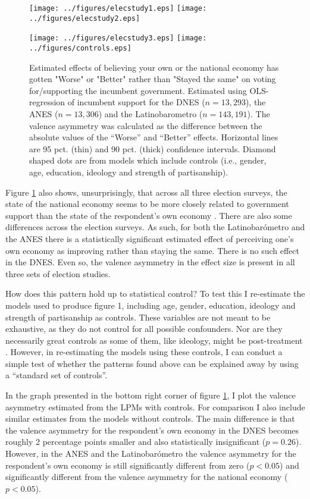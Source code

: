 \documentclass[a4paper,11pt]{article}
\begin{document}
	
	\begin{figure}[htbp]
		\texttt{[image: ../figures/elecstudy1.eps]} 	\centering	\texttt{[image: ../figures/elecstudy2.eps]} 
		
		\texttt{[image: ../figures/elecstudy3.eps]}
		\texttt{[image: ../figures/controls.eps]}
		\centering
		
		
		\caption{Estimated effects of believing your own or the national economy has gotten "Worse" or "Better" rather than "Stayed the same" on voting for/supporting the incumbent government. Estimated using OLS-regression of incumbent support for the DNES ($n=13,293$), the ANES ($n= 13,306$) and the Latinobarometro ($n= 143,191$). The valence asymmetry was calculated as the difference between the absolute values of the ``Worse'' and ``Better'' effects. Horizontal lines are 95 pct. (thin) and 90 pct. (thick) confidence intervals. Diamond shaped dots are from models which include controls (i.e., gender, age, education, ideology and strength of partisanship).}
		\label{electionstudy}
	\end{figure}
	
	Figure \ref{electionstudy}  also shows, unsurprisingly, that across all three election surveys, the state of the national economy seems to be more closely related to government support than the state of the respondent's own economy \cite[cf.][]{kinder1981sociotropic}. There are also some differences across the election surveys.  As such, for both the Latinobarómetro and the ANES there is a statistically significant estimated effect of perceiving one's own economy as improving rather than staying the same. There is no such effect in the DNES. Even so, the valence asymmetry in the effect size is present in all three sets of election studies.
	
	How does this pattern hold up to statistical control? To test this I re-estimate the models used to produce figure 1, including age, gender, education, ideology and strength of partisanship as controls. These variables are not meant to be exhaustive, as they do not control for all possible confounders. Nor are they necessarily great controls as some of them, like ideology, might be post-treatment \citep{king2010hard}. However, in re-estimating the models using these controls, I can conduct a simple test of whether the patterns found above can be explained away by using a ``standard set of controls''.
	
	In the graph presented in the bottom right corner of figure \ref{electionstudy}, I plot the valence asymmetry estimated from the LPMs with controls. For comparison I also include similar estimates from the models without controls. The main difference is that the valence asymmetry for the respondent's own economy in the DNES becomes roughly 2 percentage points smaller and also statistically insignificant ($p=0.26$). However, in the ANES and the Latinobarómetro the valence asymmetry for the respondent's own economy is still significantly different from zero ($p<0.05$) and significantly different from the valence asymmetry for the national economy ($p<0.05$). 
	
\end{document}

